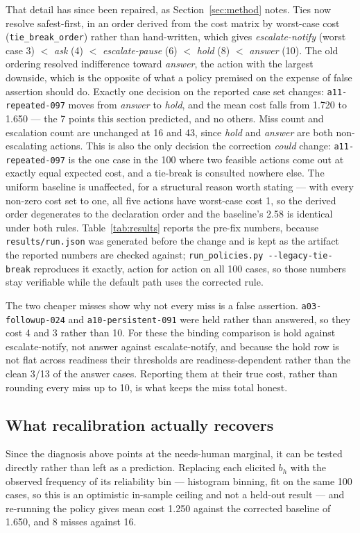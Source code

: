 \documentclass{article}
\begin{document}
That detail has since been repaired, as Section~\ref{sec:method} notes. Ties now
resolve safest-first, in an order derived from the cost matrix by worst-case cost
(\texttt{tie\_break\_order}) rather than hand-written, which gives
\emph{escalate-notify} (worst case 3) $<$ \emph{ask} (4) $<$
\emph{escalate-pause} (6) $<$ \emph{hold} (8) $<$ \emph{answer} (10). The old
ordering resolved indifference toward \emph{answer}, the action with the largest
downside, which is the opposite of what a policy premised on the expense of false
assertion should do. Exactly one decision on the reported case set changes:
\texttt{a11-repeated-097} moves from \emph{answer} to \emph{hold}, and the mean cost
falls from 1.720 to 1.650 --- the 7 points this section predicted, and no others.
Miss count and escalation count are unchanged at 16 and 43, since \emph{hold} and
\emph{answer} are both non-escalating actions. This is also the only decision the
correction \emph{could} change: \texttt{a11-repeated-097} is the one case in the 100
where two feasible actions come out at exactly equal expected cost, and a tie-break
is consulted nowhere else. The uniform baseline is unaffected, for a structural
reason worth stating --- with every non-zero cost set to one, all five actions have
worst-case cost 1, so the derived order degenerates to the declaration order and the
baseline's 2.58 is identical under both rules. Table~\ref{tab:results}
reports the pre-fix numbers, because \texttt{results/run.json} was generated before
the change and is kept as the artifact the reported numbers are checked against;
\texttt{run\_policies.py -}\texttt{-legacy-tie-break} reproduces it exactly, action
for action on all 100 cases, so those numbers stay verifiable while the default path
uses the corrected rule.

The two cheaper misses show why not every miss is a false assertion.
\texttt{a03-followup-024} and \texttt{a10-persistent-091} were held rather than
answered, so they cost 4 and 3 rather than 10. For these the binding comparison
is hold against escalate-notify, not answer against escalate-notify, and because
the hold row is not flat across readiness their thresholds are readiness-dependent
rather than the clean 3/13 of the answer cases. Reporting them at their true cost,
rather than rounding every miss up to 10, is what keeps the miss total honest.

\subsection{What recalibration actually recovers}
Since the diagnosis above points at the needs-human marginal, it can be tested
directly rather than left as a prediction. Replacing each elicited $b_h$ with the
observed frequency of its reliability bin --- histogram binning, fit on the same
100 cases, so this is an optimistic in-sample ceiling and not a held-out result ---
and re-running the policy gives mean cost 1.250 against the corrected baseline of
1.650, and 8 misses against
16.
\end{document}
